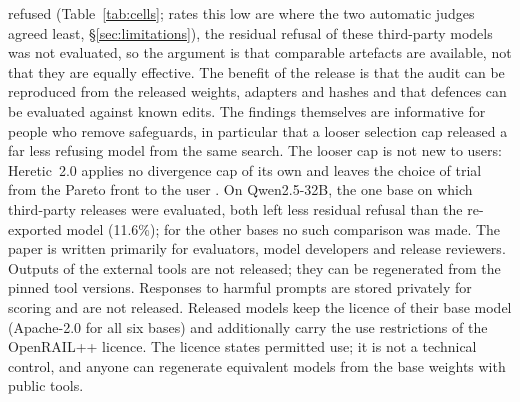 \documentclass{article}
\begin{document}
refused (Table~\ref{tab:cells}; rates this low are where the two automatic judges agreed least, \S\ref{sec:limitations}), the residual refusal of these third-party models was not evaluated, so the argument is
that comparable artefacts are available, not that they are equally effective. The benefit of the release is that the
audit can be reproduced from the released weights, adapters and hashes and that defences can be evaluated against
known edits. The findings themselves are informative for people who remove safeguards, in particular that a looser
selection cap released a far less refusing model from the same search. The looser cap is not new to users:
Heretic~2.0 applies no divergence cap of its own and leaves the choice of trial from the Pareto front to the user
\cite{heretic2025}. On Qwen2.5-32B, the one base on which third-party releases were evaluated, both left less residual
refusal than the re-exported model (11.6\%); for the other bases no such comparison was made. The paper
is written primarily for evaluators, model developers and release reviewers. Outputs of the external tools are not
released; they can be regenerated from the pinned tool versions. Responses to harmful prompts are stored privately for
scoring and are not released. Released models keep the licence of their base model (Apache-2.0 for all six bases) and
additionally carry the use restrictions of the OpenRAIL++ licence. The licence states permitted use; it is not a
technical control, and anyone can regenerate equivalent models from the base weights with public tools.
\end{document}
